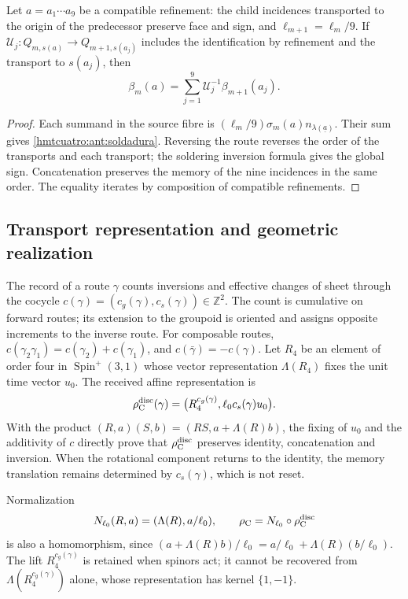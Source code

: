 \begin{proposition}
\label{hmtcuatro:ant:refinamiento-soldadura} Let \(a=a_1\cdots a_9\) be a compatible refinement: the child incidences transported to the origin of the predecessor preserve face and sign, and \(\ell_{m+1}=\ell_m/9\). If \(\mathcal U_j:Q_{m,s(a)}\to Q_{m+1,s(a_j)}\) includes the identification by refinement and the transport to \(s(a_j)\), then
\[
 \beta_m(a)=\sum_{j=1}^9\mathcal U_j^{-1}\beta_{m+1}(a_j).
\]
\end{proposition}
\begin{proof}
Each summand in the source fibre is \((\ell_m/9)\sigma_m(a)n_{\lambda(\underline a)}\). Their sum gives \eqref{hmtcuatro:ant:soldadura}. Reversing the route reverses the order of the transports and each transport; the soldering inversion formula gives the global sign. Concatenation preserves the memory of the nine incidences in the same order. The equality iterates by composition of compatible refinements.
\end{proof}

\subsection{Transport representation and geometric realization}
\label{hmtcuatro:ant:geometria}

The record of a route \(\gamma\) counts inversions and effective changes of sheet through the cocycle \(c(\gamma)=(c_g(\gamma),c_s(\gamma))\in\mathbb Z^2\). The count is cumulative on forward routes; its extension to the groupoid is oriented and assigns opposite increments to the inverse route. For composable routes, \(c(\gamma_2\gamma_1)=c(\gamma_2)+c(\gamma_1)\), and \(c(\bar\gamma)=-c(\gamma)\). Let \(R_4\) be an element of order four in \(\operatorname{Spin}^+(3,1)\) whose vector representation \(\Lambda(R_4)\) fixes the unit time vector \(u_0\). The received affine representation is
\[
 \rho_{\rm C}^{\rm disc}(\gamma)
 =\bigl(R_4^{c_g(\gamma)},\ell_0c_s(\gamma)u_0\bigr).
\]
With the product \((R,a)(S,b)=(RS,a+\Lambda(R)b)\), the fixing of \(u_0\) and the additivity of \(c\) directly prove that \(\rho_{\rm C}^{\rm disc}\) preserves identity, concatenation and inversion. When the rotational component returns to the identity, the memory translation remains determined by \(c_s(\gamma)\), which is not reset.

Normalization
\[
 N_{\ell_0}(R,a)=(\Lambda(R),a/\ell_0),\qquad
 \rho_{\rm C}=N_{\ell_0}\circ\rho_{\rm C}^{\rm disc}
\]
is also a homomorphism, since \((a+\Lambda(R)b)/\ell_0=a/\ell_0+\Lambda(R)(b/\ell_0)\). The lift \(R_4^{c_g(\gamma)}\) is retained when spinors act; it cannot be recovered from \(\Lambda(R_4^{c_g(\gamma)})\) alone, whose representation has kernel \(\{1,-1\}\).

